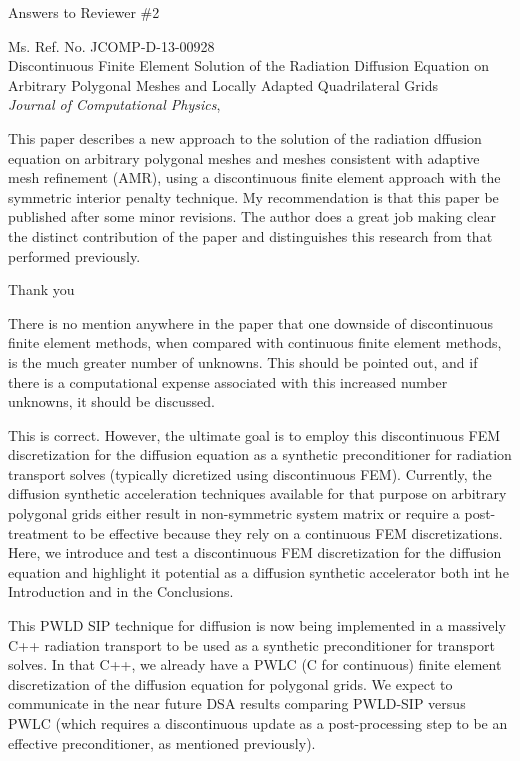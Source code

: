 \documentclass{article}
\begin{document}
\begin{center}
{ \Large Answers to Reviewer \#2}
\end{center}

\bigskip

\noindent Ms. Ref. No. JCOMP-D-13-00928\\
Discontinuous Finite Element Solution of the Radiation Diffusion Equation on Arbitrary Polygonal Meshes and Locally Adapted Quadrilateral Grids\\
{\it Journal of Computational Physics},\\

\bigskip
\bigskip

{
\color{blue}
This paper describes a new approach to the solution of the radiation dffusion
equation on arbitrary polygonal meshes and meshes consistent with adaptive
mesh refinement (AMR), using a discontinuous finite element approach with the
symmetric interior penalty technique. My recommendation is that this paper
be published after some minor revisions. The author does a great job making
clear the distinct contribution of the paper and distinguishes this research from
that performed previously.
}

Thank you
\bigskip


{
\color{blue}
There is no mention anywhere in the paper that one downside of discontinuous finite element methods, when compared with continuous finite
element methods, is the much greater number of unknowns. This should
be pointed out, and if there is a computational expense associated with
this increased number unknowns, it should be discussed.
}


This is correct. However, the ultimate goal is to employ this discontinuous FEM discretization for the diffusion equation 
as a synthetic preconditioner for radiation transport solves (typically dicretized using discontinuous FEM). Currently, the 
diffusion synthetic acceleration techniques available for that purpose on arbitrary polygonal grids either result in 
non-symmetric system matrix or require a post-treatment to be effective because they rely on a continuous FEM discretizations. Here,
we introduce and test a discontinuous FEM discretization for the diffusion equation and highlight it potential as a diffusion synthetic accelerator both int he Introduction and in the Conclusions. 

This PWLD SIP technique for diffusion is now being implemented in a massively C++ radiation transport to be used as a 
synthetic preconditioner for transport solves. In that C++, we already have a PWLC (C for continuous)
finite element discretization of the diffusion equation for polygonal grids. We expect to communicate in the near
future DSA results comparing PWLD-SIP versus PWLC (which requires a discontinuous update as a post-processing step to
be an effective preconditioner, as mentioned previously).
\end{document}
